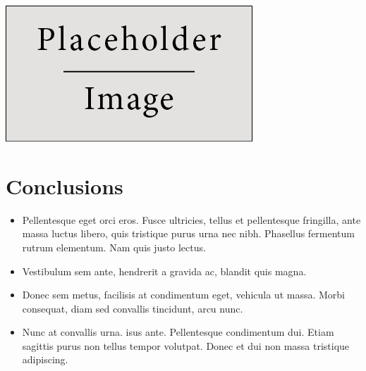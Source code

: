 \documentclass[a0,portrait]{a0poster}
\begin{document}
\begin{multicols}{2}
\begin{center}\vspace{1cm}
\includegraphics[width=0.8\linewidth]{placeholder}
\end{center}\vspace{1cm}


\color{DarkRed} %

\section*{Conclusions}

\begin{itemize}
\item Pellentesque eget orci eros. Fusce ultricies, tellus et pellentesque fringilla, ante massa luctus libero, quis tristique purus urna nec nibh. Phasellus fermentum rutrum elementum. Nam quis justo lectus.
\item Vestibulum sem ante, hendrerit a gravida ac, blandit quis magna.
\item Donec sem metus, facilisis at condimentum eget, vehicula ut massa. Morbi consequat, diam sed convallis tincidunt, arcu nunc.
\item Nunc at convallis urna. isus ante. Pellentesque condimentum dui. Etiam sagittis purus non tellus tempor volutpat. Donec et dui non massa tristique adipiscing.
\end{itemize}

\color{DarkSlateGray} %



\end{multicols}
\end{document}
